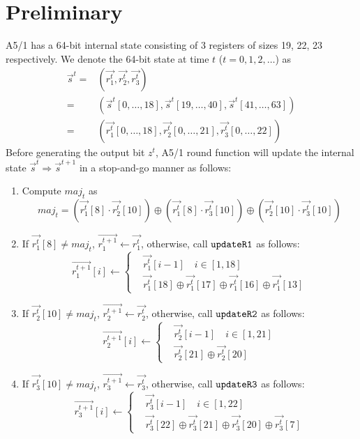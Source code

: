 \section{Preliminary}
A5/1 has a 64-bit internal state consisting of 3 registers of sizes 19, 22, 23 respectively.
We denote the 64-bit state at time $t$ ($t=0,1,2,\ldots$) as
\begin{equation}\label{eq:StateAndRi}
\begin{split}
   \vec s^t= & (\vec{r_1^t}, \vec{r_2^t}, \vec{r_3^t})\\
     =& (\vec{s}^t[0,\ldots, 18],\vec{s}^t[19,\ldots, 40],\vec{s}^t[41,\ldots, 63])\\
     =&(\vec{r_1^t}[0,\ldots,18],\vec{r_2^t}[0,\ldots, 21],\vec{r_3^t}[0,\ldots,22])
\end{split}
\end{equation}
Before generating the output bit $z^t$, A5/1 round function will update the internal state $\vec{s}^t\Rightarrow \vec{s}^{t+1}$ in a stop-and-go manner as follows:
\begin{enumerate}
  \item Compute $maj_t$ as
\begin{equation}\label{eq:Majt}
  maj_t=(\vec{r_1^t}[8]\cdot \vec{r_2^t}[10])\oplus (\vec{r_1^t}[8]\cdot \vec{r_3^t}[10])\oplus (\vec{r_2^t}[10]\cdot \vec{r_3^t}[10])
\end{equation}
  \item If $\vec{r_1^t}[8]\neq maj_t$, $\vec{r_1^{t+1}}\leftarrow \vec{r_1^t}$, otherwise, call $\tt{updateR1}$ as follows:
  \begin{equation}\label{eq:UpdateR1}
    \vec{r_1^{t+1}}[i]\leftarrow\left\{
    \begin{aligned}
      &\vec{r_1^t}[i-1]\quad i\in [1,18]\\
      &\vec{r_1^t}[18]\oplus \vec{r_1^t}[17]\oplus \vec{r_1^t}[16]\oplus \vec{r_1^t}[13]
    \end{aligned}
    \right.
  \end{equation}
  \item If $\vec{r_2^t}[10]\neq maj_t$, $\vec{r_2^{t+1}}\leftarrow \vec{r_2^t}$, otherwise, call $\tt{updateR2}$ as follows:
    \begin{equation}\label{eq:UpdateR2}
    \vec{r_2^{t+1}}[i]\leftarrow\left\{
    \begin{aligned}
      &\vec{r_2^t}[i-1]\quad i\in [1,21]\\
      &\vec{r_2^t}[21]\oplus \vec{r_2^t}[20]
    \end{aligned}
    \right.
  \end{equation}
    \item If $\vec{r_3^t}[10]\neq maj_t$, $\vec{r_3^{t+1}}\leftarrow \vec{r_3^t}$, otherwise, call $\tt{updateR3}$ as follows:
    \begin{equation}\label{eq:UpdateR3}
    \vec{r_3^{t+1}}[i]\leftarrow\left\{
    \begin{aligned}
      &\vec{r_3^t}[i-1]\quad i\in [1,22]\\
      &\vec{r_3^t}[22]\oplus \vec{r_3^t}[21]\oplus \vec{r_3^t}[20]\oplus \vec{r_3^t}[7]
    \end{aligned}
    \right.
  \end{equation}
\end{enumerate}
